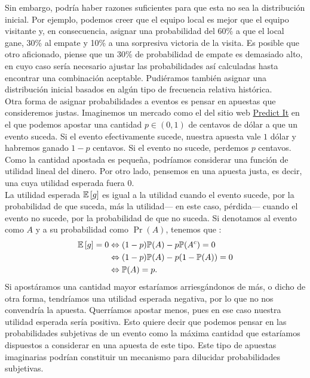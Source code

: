 Sin embargo, podría haber razones suficientes para que esta no sea la distribución inicial. Por ejemplo, podemos creer que el equipo local es mejor que el equipo visitante y, en consecuencia, asignar una probabilidad del  60\% a que el local gane, 30\% al empate y 10\% a una sorpresiva victoria de la visita. Es posible que otro aficionado, piense que un 30\% de probabilidad de empate es demasiado alto, en cuyo caso sería necesario ajustar las probabilidades así calculadas hasta encontrar una combinación aceptable. Pudiéramos también asignar una distribución inicial basados en algún tipo de frecuencia relativa histórica.\\ 

Otra forma de asignar probabilidades a eventos es pensar en apuestas que consideremos justas. Imaginemos un mercado como el del sitio web 	\href{https://www.predictit.org/}{Predict It} en el que podemos apostar una cantidad $p \in (0,1)$ de centavos de dólar a que un evento suceda. Si el evento efectivamente sucede, nuestra apuesta vale $1$ dólar y habremos ganado $1-p$ centavos. Si el evento no sucede, perdemos $p$ centavos. Como la cantidad apostada es pequeña, podríamos considerar una función de utilidad lineal del dinero. Por otro lado, pensemos en una apuesta justa, es decir, una cuya utilidad esperada fuera $0$.\\ 

La utilidad esperada $\mathbb{E}\left[ g \right]$ es igual a la utilidad cuando el evento sucede, por la probabilidad de que suceda, más la utilidad--- en este caso, pérdida--- cuando el evento no sucede, por la probabilidad de que no suceda. Si denotamos al evento como $A$ y a su probabilidad como $\Pr(A)$, tenemos que : 
\begin{align*}
\mathbb{E}\left[ g \right] = 0 &\Leftrightarrow (1-p)\mathbb{P}(A) - p\mathbb{P}(A^c) = 0 \\
&\Leftrightarrow (1-p)\mathbb{P}(A) - p(1-\mathbb{P}(A))= 0\\ 
&\Leftrightarrow \mathbb{P}(A) = p.
\end{align*}
Si apostáramos una cantidad mayor estaríamos arriesgándonos de más, o dicho de otra forma, tendríamos una utilidad esperada negativa, por lo que no nos convendría la apuesta. Querríamos apostar menos, pues en ese caso nuestra utilidad esperada sería positiva. Esto quiere decir que podemos pensar en las probabilidades subjetivas de un evento como la máxima cantidad que estaríamos dispuestos a considerar en una apuesta de este tipo. Este tipo de apuestas imaginarias podrían constituir un mecanismo para dilucidar probabilidades subjetivas.\\ 

